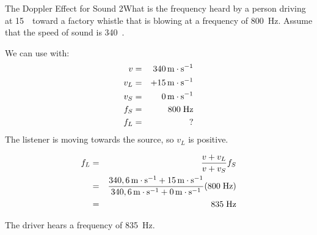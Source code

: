 \clearpage

\begin{wex}{The Doppler Effect for Sound 2}{What is the frequency heard by a person driving at 15~\ms\ toward a factory whistle that is blowing at a frequency of 800~Hz. Assume that the speed of sound is 340~\ms.}{
We can use
with:
\begin{eqnarray*}
v&=&340 \,\mathrm{m \cdot s^{-1}}\\
v_L&=&+15\,\mathrm{m \cdot s^{-1}}\\
v_S&=&0\,\mathrm{m \cdot s^{-1}}\\
f_S&=&800\;\rm{Hz}\\
f_L&=&\rm{?}
\end{eqnarray*}
The listener is moving towards the source, so $v_L$ is positive.

\begin{eqnarray*}
f_L&=&\frac{v + v_L}{v + v_S}f_S\\
&=&\frac{340,6\,\mathrm{m \cdot s^{-1}} + 15\,\mathrm{m \cdot s^{-1}}}{340,6\,\mathrm{m \cdot s^{-1}} + 0\,\mathrm{m \cdot s^{-1}}}(800\;\rm{Hz})\\
&=&835\;\rm{Hz}
\end{eqnarray*}

The driver hears a frequency of 835~Hz.}
\end{wex}


\clearpage

